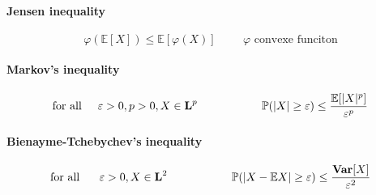 \documentclass[a4paper,10pt]{article}
\begin{document}
\paragraph{Jensen inequality}
\[
\varphi(\mathbb{E}[X]) \leq \mathbb{E}[\varphi(X)]
\hspace{1cm} \varphi \text{ convexe funciton}
\]
\paragraph{Markov's inequality}
\[
\text{for all}\hspace{5mm} \varepsilon > 0, p>0, X\in \textbf{L}^p \hspace{20mm} \mathbb{P}(|X| \geq \varepsilon) \leq \frac{\mathbb{E}[|X|^p]}{\varepsilon ^p}
\]
\paragraph{Bienayme-Tchebychev's inequality}
\[
\text{for all  } \hspace{5mm} \varepsilon > 0, X\in \textbf{L}^2 \hspace{20mm} \mathbb{P}(|X- \mathbb{E}X| \geq \varepsilon) \leq \frac{\textbf{Var}[X]}{\varepsilon ^2}
\]


\end{document}
